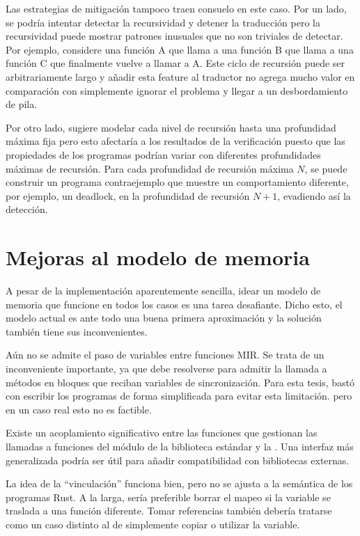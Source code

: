 Las estrategias de mitigación tampoco traen consuelo en este caso. Por un lado, se
podría intentar detectar la recursividad y detener la traducción pero la recursividad puede
mostrar patrones inusuales que no son triviales de detectar. Por ejemplo, considere una función
A que llama a una función B que llama a una función C que finalmente vuelve a llamar a A.
Este ciclo de recursión puede ser arbitrariamente largo y añadir esta feature al traductor no
agrega mucho valor en comparación con simplemente ignorar el problema y llegar a un
desbordamiento de pila.

Por otro lado, \cite{meyer2020} sugiere modelar cada nivel de recursión hasta una profundidad
máxima fija pero esto afectaría a los resultados de la verificación puesto que las propiedades de
los programas podrían variar con diferentes profundidades máximas de recursión. Para cada
profundidad de recursión máxima $N$, se puede construir un programa contraejemplo que
muestre un comportamiento diferente, por ejemplo, un deadlock, en la profundidad de recursión
$N+1$, evadiendo así la detección.

\section{Mejoras al modelo de memoria}
\label{sec:future-work-memory-model}

A pesar de la implementación aparentemente sencilla, idear un modelo de memoria que
funcione en todos los casos es una tarea desafiante. Dicho esto, el modelo actual es ante todo una
buena primera aproximación y la solución también tiene sus inconvenientes.

Aún no se admite el paso de variables entre funciones \acrshort{MIR}. Se trata de un inconveniente
importante, ya que debe resolverse para admitir la llamada a métodos en bloques  que
reciban variables de sincronización. Para esta tesis, bastó con escribir los programas de forma
simplificada para evitar esta limitación. pero en un caso real esto no es factible.

Existe un acoplamiento significativo entre las funciones que gestionan las llamadas a
funciones del módulo  de la biblioteca estándar y la .
Una interfaz más generalizada podría ser útil para añadir compatibilidad con bibliotecas externas.

La idea de la ``vinculación'' funciona bien, pero no se ajusta a la semántica de los programas
Rust. A la larga, sería preferible borrar el mapeo si la variable se traslada a una función
diferente. Tomar referencias también debería tratarse como un caso distinto al de simplemente
copiar o utilizar la variable.

